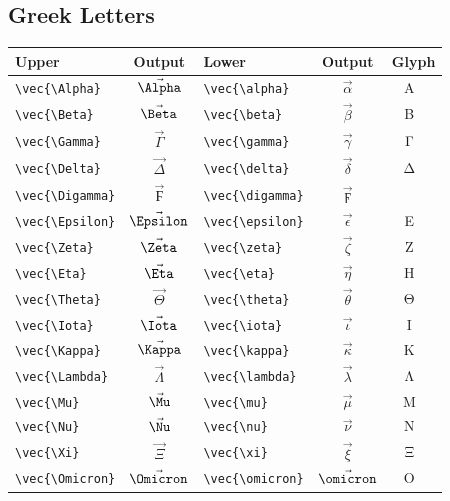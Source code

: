 \documentclass[12pt,a4paper]{article}
\begin{document}
\subsection*{Greek Letters}
\begin{longtable}{|l|c|l|c|c|}
\hline
\textbf{Upper}           & \textbf{Output}  & \textbf{Lower}           & \textbf{Output}     & \textbf{Glyph} \\
\hline
\verb|\vec{\Alpha}|      & $\vec{\Alpha}$   & \verb|\vec{\alpha}|      & $\vec{\alpha}$      & Α⃗ α⃗ \\
\verb|\vec{\Beta}|       & $\vec{\Beta}$    & \verb|\vec{\beta}|       & $\vec{\beta}$       & Β⃗ β⃗ \\
\verb|\vec{\Gamma}|      & $\vec{\Gamma}$   & \verb|\vec{\gamma}|      & $\vec{\gamma}$      & Γ⃗ γ⃗ \\
\verb|\vec{\Delta}|      & $\vec{\Delta}$   & \verb|\vec{\delta}|      & $\vec{\delta}$      & Δ⃗ δ⃗ \\
\verb|\vec{\Digamma}|    & $\vec{\Digamma}$ & \verb|\vec{\digamma}|    & $\vec{\digamma}$    & Ϝ⃗ ϝ⃗ \\
\verb|\vec{\Epsilon}|    & $\vec{\Epsilon}$ & \verb|\vec{\epsilon}|    & $\vec{\epsilon}$    & Ε⃗ ϵ⃗ \\
\verb|\vec{\Zeta}|       & $\vec{\Zeta}$    & \verb|\vec{\zeta}|       & $\vec{\zeta}$       & Ζ⃗ ζ⃗ \\
\verb|\vec{\Eta}|        & $\vec{\Eta}$     & \verb|\vec{\eta}|        & $\vec{\eta}$        & Η⃗ η⃗ \\
\verb|\vec{\Theta}|      & $\vec{\Theta}$   & \verb|\vec{\theta}|      & $\vec{\theta}$      & Θ⃗ θ⃗ \\
\verb|\vec{\Iota}|       & $\vec{\Iota}$    & \verb|\vec{\iota}|       & $\vec{\iota}$       & Ι⃗ ι⃗ \\
\verb|\vec{\Kappa}|      & $\vec{\Kappa}$   & \verb|\vec{\kappa}|      & $\vec{\kappa}$      & Κ⃗ κ⃗ \\
\verb|\vec{\Lambda}|     & $\vec{\Lambda}$  & \verb|\vec{\lambda}|     & $\vec{\lambda}$     & Λ⃗ λ⃗ \\
\verb|\vec{\Mu}|         & $\vec{\Mu}$      & \verb|\vec{\mu}|         & $\vec{\mu}$         & Μ⃗ μ⃗ \\
\verb|\vec{\Nu}|         & $\vec{\Nu}$      & \verb|\vec{\nu}|         & $\vec{\nu}$         & Ν⃗ ν⃗ \\
\verb|\vec{\Xi}|         & $\vec{\Xi}$      & \verb|\vec{\xi}|         & $\vec{\xi}$         & Ξ⃗ ξ⃗ \\
\verb|\vec{\Omicron}|    & $\vec{\Omicron}$ & \verb|\vec{\omicron}|    & $\vec{\omicron}$    & Ο⃗ ο⃗ \\

\end{longtable}
\end{document}
